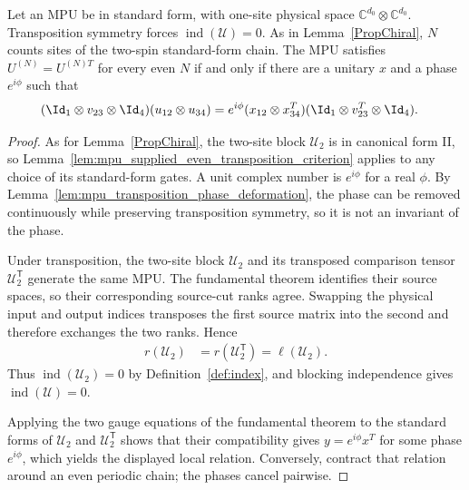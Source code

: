 \begin{lemma}
    \label{prop:local-char-transposition}
    \leanok
    Let an MPU be in standard form, with one-site physical space
    $\mathbb C^{d_0}\otimes\mathbb C^{d_0}$. Transposition symmetry forces
    $\operatorname{ind}(\mathcal U)=0$. As in Lemma~\ref{PropChiral}, $N$
    counts sites of the two-spin standard-form chain. The MPU satisfies
    $U^{(N)}=U^{(N)T}$ for every even $N$ if and only if there are a unitary
    $x$ and a phase $e^{i\phi}$ such that
    \begin{align}
        (\Id_1\otimes v_{23}\otimes\Id_4)(u_{12}\otimes u_{34})
         & =e^{i\phi}(x_{12}\otimes x_{34}^T)
        (\Id_1\otimes v_{23}^T\otimes\Id_4).
    \end{align}
\end{lemma}

\begin{proof}\leanok
    As for Lemma~\ref{PropChiral}, the two-site block $\mathcal U_2$ is in
    canonical form II, so
    Lemma~\ref{lem:mpu_supplied_even_transposition_criterion} applies to any
    choice of its standard-form gates. A unit complex number is $e^{i\phi}$
    for a real $\phi$. By
    Lemma~\ref{lem:mpu_transposition_phase_deformation}, the phase can be
    removed continuously while preserving transposition symmetry, so it is not
    an invariant of the phase.

    Under transposition, the two-site block $\mathcal U_2$ and its transposed
    comparison tensor $\mathcal U_2^{\mathsf T}$ generate the same MPU. The
    fundamental theorem identifies their source spaces, so their corresponding
    source-cut ranks agree. Swapping the physical input and output indices
    transposes the first source matrix into the second and therefore exchanges
    the two ranks. Hence
    \begin{align}
        r(\mathcal U_2)
         & =r(\mathcal U_2^{\mathsf T})
        =\ell(\mathcal U_2).
    \end{align}
    Thus $\operatorname{ind}(\mathcal U_2)=0$ by
    Definition~\ref{def:index}, and blocking independence gives
    $\operatorname{ind}(\mathcal U)=0$.

    Applying the two gauge equations of the fundamental theorem to the standard
    forms of $\mathcal U_2$ and $\mathcal U_2^{\mathsf T}$ shows that their compatibility
    gives $y=e^{i\phi}x^T$ for some phase $e^{i\phi}$, which yields the
    displayed local relation. Conversely, contract that relation around an
    even periodic chain; the phases cancel pairwise.
\end{proof}

